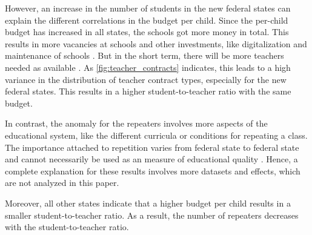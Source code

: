 However,  an increase in the number of students in the new federal states can explain the different correlations in the budget per child. Since the per-child budget has increased in all states, the schools got more money in total. This results in more vacancies at schools \cite{kultusminister_konferenz_lehrkrafteeinstellungsbedarf_2023} and other investments, like digitalization and maintenance of schools \cite{bundesministerium_fur_bildung_und_forschung_fortschrittsbericht_2022}. But in the short term, there will be more teachers needed as available \cite{kultusminister_konferenz_lehrkrafteeinstellungsbedarf_2023}. As \autoref{fig:teacher_contracts} indicates, this leads to a high variance in the distribution of teacher contract types, especially for the new federal states. This results in a higher student-to-teacher ratio with the same budget.

In contrast, the anomaly for the repeaters involves more aspects of the educational system, like the different curricula or conditions for repeating a class. The importance attached to repetition varies from federal state to federal state and cannot necessarily be used as an measure of educational quality \cite{klemm_klassenwiederholungen_2009}. Hence, a complete explanation for these results involves more datasets and effects, which are not analyzed in this paper.

Moreover, all other states indicate that a higher budget per child results in a smaller student-to-teacher ratio. As a result, the number of repeaters decreases with the student-to-teacher ratio.